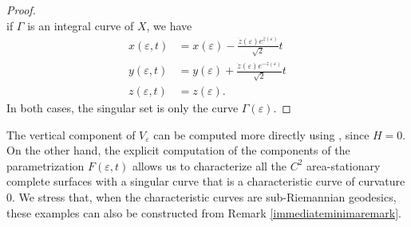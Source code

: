 \documentclass[10pt]{amsart}
\theoremstyle{definition}
\theoremstyle{remark}
\numberwithin{equation}{section}
\begin{document}
\begin{proof}
\begin{equation}
\end{equation}
if ${\Gamma}$ is an integral curve of $X$, we have
\begin{equation}
\begin{split}
x({\varepsilon},t)&=x({\varepsilon})-\frac{\dot{z}({\varepsilon})e^{z({\varepsilon})}}{\sqrt{2}}t\\
y({\varepsilon},t)&=y({\varepsilon})+\frac{\dot{z}({\varepsilon})e^{-z({\varepsilon})}}{\sqrt{2}}t\\
z({\varepsilon},t)&=z({\varepsilon}).
\end{split}
\end{equation}
In both cases, the singular set is only the curve ${\Gamma}({\varepsilon})$.

\end{proof}

The vertical component of $V_{\varepsilon}$ can be computed more directly using \cite[Proposition~4.3]{MR3044134}, since $H=0$. On the other hand, the explicit computation of the components of the parametrization $F({\varepsilon},t)$ allows us to characterize all the $C^2$ area-stationary complete surfaces with a singular curve that is a characteristic curve of curvature $0$. We stress that, when the characteristic curves are sub-Riemannian geodesics, these examples can also be constructed from Remark \ref{immediateminimaremark}.
\end{document}
